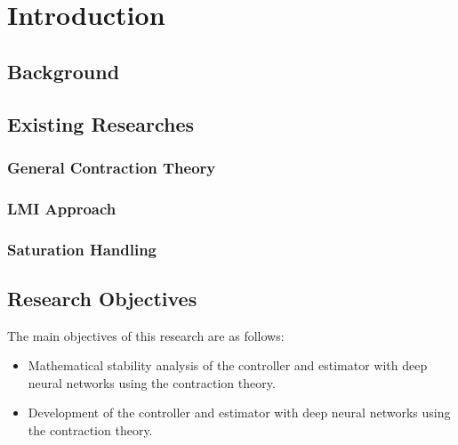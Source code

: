 

\section{Introduction}\label{chap:introduction}

\subsection{Background}

\subsection{Existing Researches}

\subsubsection{General Contraction Theory}

\subsubsection{LMI Approach}

\subsubsection{Saturation Handling}

\cite{Zaccarian:2001aa}

\subsection{Research Objectives}

The main objectives of this research are as follows:
\begin{itemize}
    \item Mathematical stability analysis of the controller and estimator with deep neural networks using the contraction theory.
    \item Development of the controller and estimator with deep neural networks using the contraction theory.
\end{itemize}